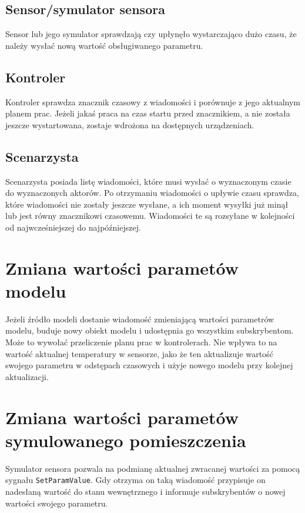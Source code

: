 \subsection{Sensor/symulator sensora }
Sensor lub jego symulator sprawdzają czy upłynęło wystarczająco dużo czasu, że należy wysłać nową wartość obsługiwanego parametru.


\subsection{Kontroler }
Kontroler sprawdza znacznik czasowy z wiadomości i porównuje z jego aktualnym planem prac. Jeżeli jakaś praca na czas startu przed znacznikiem, a nie została jeszcze wystartowana, zostaje wdrożona na dostępnych urządzeniach.


\subsection{Scenarzysta }
Scenarzysta posiada listę wiadomości, które musi wysłać o wyznaczonym czasie do wyznaczonych aktorów. Po otrzymaniu wiadomości o upływie czasu sprawdza, które wiadomości nie zostały jeszcze wysłane, a ich moment wysyłki już minął lub jest równy znacznikowi czasowemu. Wiadomości te są rozsyłane w kolejności od najwcześniejszej do najpóźniejszej. 


\section{Zmiana wartości parametów modelu}
Jeżeli źródło modeli dostanie wiadomość zmieniającą wartości parametrów modelu, buduje nowy obiekt modelu i udostępnia go wszystkim subskrybentom.
Może to wywołać przeliczenie planu prac w kontrolerach. Nie wpływa to na wartość aktualnej temperatury w sensorze, jako że ten aktualizuje wartość swojego parametru w odstępach czasowych i użyje nowego modelu przy kolejnej aktualizacji.

\section{Zmiana wartości parametów symulowanego pomieszczenia}
Symulator sensora pozwala na podmianę aktualnej zwracanej wartości za pomocą sygnału \lstinline{SetParamValue}. Gdy otrzyma on taką wiadomość przypisuje on nadesłaną wartość do stanu wewnętrznego i informuje subskrybentów o nowej wartości swojego parametru. 


